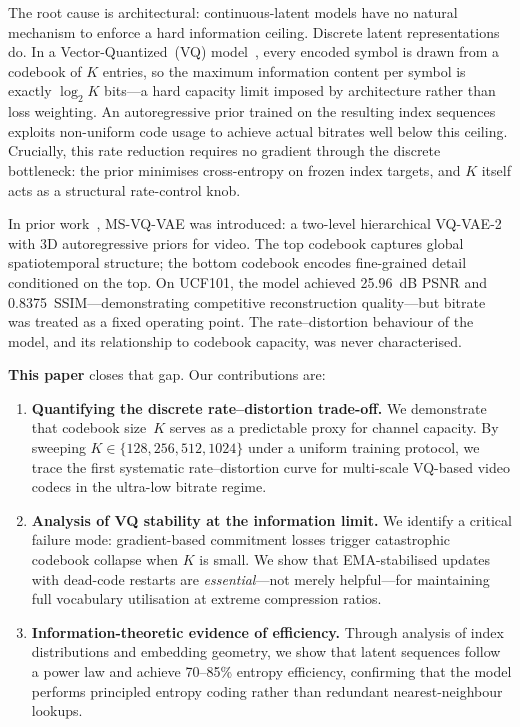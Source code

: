 \documentclass[sigconf, screen, review, anonymous]{acmart}
\begin{document}
The root cause is architectural: continuous-latent models have no
natural mechanism to enforce a hard information ceiling. Discrete
latent representations do. In a Vector-Quantized~(VQ) model~\cite{oord2017vqvae},
every encoded symbol is drawn from a codebook of $K$ entries, so the
maximum information content per symbol is exactly $\log_2 K$ bits---a
hard capacity limit imposed by architecture rather than loss weighting.
An autoregressive prior trained on the resulting index sequences exploits
non-uniform code usage to achieve actual bitrates well below this
ceiling. Crucially, this rate reduction requires no gradient through the
discrete bottleneck: the prior minimises cross-entropy on frozen index
targets, and $K$ itself acts as a structural rate-control knob.

In prior work~\cite{kotthapalli2026msvqvae},
MS-VQ-VAE was introduced: a two-level hierarchical VQ-VAE-2 with 3D
autoregressive priors for video. The top codebook captures global
spatiotemporal structure; the bottom codebook encodes fine-grained
detail conditioned on the top. On UCF101, the model achieved 25.96~dB
PSNR and 0.8375~SSIM---demonstrating competitive reconstruction
quality---but bitrate was treated as a fixed operating point. The
rate--distortion behaviour of the model, and its relationship to
codebook capacity, was never characterised.

\noindent\textbf{This paper} closes that gap. Our contributions are:

\begin{enumerate}
  \item \textbf{Quantifying the discrete rate--distortion trade-off.}
        We demonstrate that codebook size~$K$ serves as a predictable
        proxy for channel capacity. By sweeping $K \in \{128, 256, 512,
        1024\}$ under a uniform training protocol, we trace the first
        systematic rate--distortion curve for multi-scale VQ-based video
        codecs in the ultra-low bitrate regime.

  \item \textbf{Analysis of VQ stability at the information limit.}
        We identify a critical failure mode: gradient-based commitment
        losses trigger catastrophic codebook collapse when $K$ is small.
        We show that EMA-stabilised updates with dead-code restarts are
        \emph{essential}---not merely helpful---for maintaining full
        vocabulary utilisation at extreme compression ratios.

  \item \textbf{Information-theoretic evidence of efficiency.}
        Through analysis of index distributions and embedding geometry,
        we show that latent sequences follow a power law and achieve
        70--85\% entropy efficiency, confirming that the model performs
        principled entropy coding rather than redundant
        nearest-neighbour lookups.
\end{enumerate}
\end{document}
